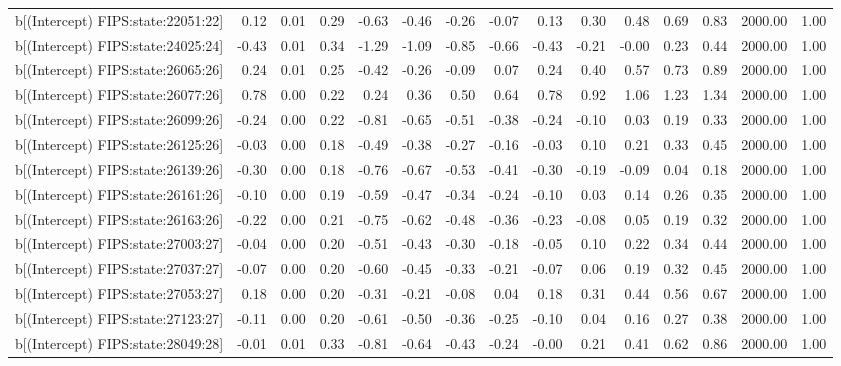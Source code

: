 \begin{table}[ht]
\begin{tabular}{rrrrrrrrrrrrrrr}
  b[(Intercept) FIPS:state:22051:22] & 0.12 & 0.01 & 0.29 & -0.63 & -0.46 & -0.26 & -0.07 & 0.13 & 0.30 & 0.48 & 0.69 & 0.83 & 2000.00 & 1.00 \\ 
  b[(Intercept) FIPS:state:24025:24] & -0.43 & 0.01 & 0.34 & -1.29 & -1.09 & -0.85 & -0.66 & -0.43 & -0.21 & -0.00 & 0.23 & 0.44 & 2000.00 & 1.00 \\ 
  b[(Intercept) FIPS:state:26065:26] & 0.24 & 0.01 & 0.25 & -0.42 & -0.26 & -0.09 & 0.07 & 0.24 & 0.40 & 0.57 & 0.73 & 0.89 & 2000.00 & 1.00 \\ 
  b[(Intercept) FIPS:state:26077:26] & 0.78 & 0.00 & 0.22 & 0.24 & 0.36 & 0.50 & 0.64 & 0.78 & 0.92 & 1.06 & 1.23 & 1.34 & 2000.00 & 1.00 \\ 
  b[(Intercept) FIPS:state:26099:26] & -0.24 & 0.00 & 0.22 & -0.81 & -0.65 & -0.51 & -0.38 & -0.24 & -0.10 & 0.03 & 0.19 & 0.33 & 2000.00 & 1.00 \\ 
  b[(Intercept) FIPS:state:26125:26] & -0.03 & 0.00 & 0.18 & -0.49 & -0.38 & -0.27 & -0.16 & -0.03 & 0.10 & 0.21 & 0.33 & 0.45 & 2000.00 & 1.00 \\ 
  b[(Intercept) FIPS:state:26139:26] & -0.30 & 0.00 & 0.18 & -0.76 & -0.67 & -0.53 & -0.41 & -0.30 & -0.19 & -0.09 & 0.04 & 0.18 & 2000.00 & 1.00 \\ 
  b[(Intercept) FIPS:state:26161:26] & -0.10 & 0.00 & 0.19 & -0.59 & -0.47 & -0.34 & -0.24 & -0.10 & 0.03 & 0.14 & 0.26 & 0.35 & 2000.00 & 1.00 \\ 
  b[(Intercept) FIPS:state:26163:26] & -0.22 & 0.00 & 0.21 & -0.75 & -0.62 & -0.48 & -0.36 & -0.23 & -0.08 & 0.05 & 0.19 & 0.32 & 2000.00 & 1.00 \\ 
  b[(Intercept) FIPS:state:27003:27] & -0.04 & 0.00 & 0.20 & -0.51 & -0.43 & -0.30 & -0.18 & -0.05 & 0.10 & 0.22 & 0.34 & 0.44 & 2000.00 & 1.00 \\ 
  b[(Intercept) FIPS:state:27037:27] & -0.07 & 0.00 & 0.20 & -0.60 & -0.45 & -0.33 & -0.21 & -0.07 & 0.06 & 0.19 & 0.32 & 0.45 & 2000.00 & 1.00 \\ 
  b[(Intercept) FIPS:state:27053:27] & 0.18 & 0.00 & 0.20 & -0.31 & -0.21 & -0.08 & 0.04 & 0.18 & 0.31 & 0.44 & 0.56 & 0.67 & 2000.00 & 1.00 \\ 
  b[(Intercept) FIPS:state:27123:27] & -0.11 & 0.00 & 0.20 & -0.61 & -0.50 & -0.36 & -0.25 & -0.10 & 0.04 & 0.16 & 0.27 & 0.38 & 2000.00 & 1.00 \\ 
  b[(Intercept) FIPS:state:28049:28] & -0.01 & 0.01 & 0.33 & -0.81 & -0.64 & -0.43 & -0.24 & -0.00 & 0.21 & 0.41 & 0.62 & 0.86 & 2000.00 & 1.00 \\ 

\end{tabular}
\end{table}
